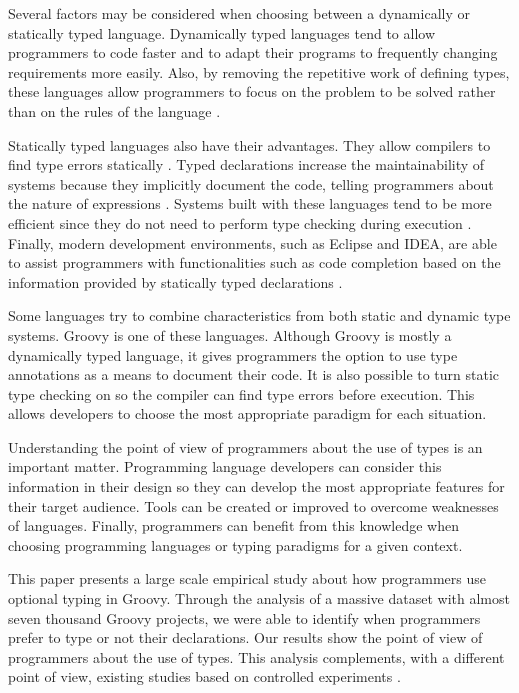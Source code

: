 \documentclass[msc]{ppgccufmg}
\begin{document}
Several factors may be considered when choosing between a dynamically or statically typed language. 
Dynamically typed languages tend to allow programmers to code faster and to adapt their programs to frequently changing requirements more easily.
Also, by removing the repetitive work of defining types, these languages allow programmers to focus on the problem to be solved rather than on the rules of the language \cite{dynamically_typed_languages}.

Statically typed languages also have their advantages. 
They allow compilers to find type errors statically \cite{should_your_specification_language_be_typed}. 
Typed declarations increase the maintainability of systems because they implicitly document the code, telling programmers about the nature of expressions \cite{type_systems,mayer2012static}. 
Systems built with these languages tend to be more efficient since they do not need to perform type checking during execution \cite{bruce2002foundations,jit}. 
Finally, modern development environments, such as Eclipse and IDEA, are able to assist programmers with functionalities such as code completion based on the information provided by statically typed declarations \cite{bruch2009learning}.

Some languages try to combine characteristics from both static and dynamic type systems.
Groovy \cite{groovy} is one of these languages.
Although Groovy is mostly a dynamically typed language, it gives programmers the option to use type annotations as a means to document their code.
It is also possible to turn static type checking on so the compiler can find type errors before execution.
This allows developers to choose the most appropriate paradigm for each situation.

Understanding the point of view of programmers about the use of types is an important matter.
Programming language developers can consider this information in their design so they can develop the most appropriate features for their target audience.
Tools can be created or improved to overcome weaknesses of languages. 
Finally, programmers can benefit from this knowledge when choosing programming languages or typing paradigms for a given context.

This paper presents a large scale empirical study about how programmers use optional typing in Groovy.
Through the analysis of a massive dataset with almost seven thousand Groovy projects, we were able to identify when programmers prefer to type or not their declarations.
Our results show the point of view of programmers about the use of types.
This analysis complements, with a different point of view, existing studies based on controlled experiments \cite{Hanenberg13, ruby_vs_druby, experiment_with_purity, hanenberg_icpc, mayer2012static, Gannon77, Prechelt98}. 
\end{document}
